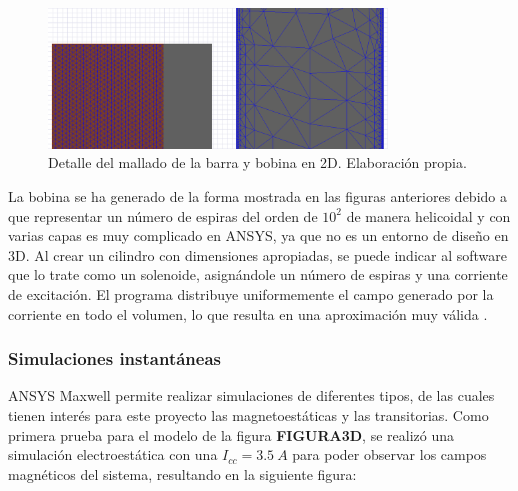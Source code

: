 \begin{itemize}
\begin{figure}[H]
        \label{fig:BarGeomMesh} %
    \end{figure}
    \begin{figure}[H]
        \centering
        \includegraphics[width=9cm]{FigurasMemoria/BarMeshDetail.png}
        \caption{Detalle del mallado de la barra y bobina en 2D. Elaboración propia.}
        \label{fig:GeomMeshDetail} %
    \end{figure}
\end{itemize}

La bobina se ha generado de la forma mostrada en las figuras anteriores debido a que representar un número de espiras del orden de \(10^2\) de manera helicoidal y con varias capas es muy complicado en ANSYS, ya que no es un entorno de diseño en 3D. Al crear un cilindro con dimensiones apropiadas, se puede indicar al software que lo trate como un solenoide, asignándole un número de espiras y una corriente de excitación. El programa distribuye uniformemente el campo generado por la corriente en todo el volumen, lo que resulta en una aproximación muy válida \citep[p. 13]{ansoft2012maxwell}.

\subsubsection{Simulaciones instantáneas}
ANSYS Maxwell permite realizar simulaciones de diferentes tipos, de las cuales tienen interés para este proyecto las magnetoestáticas y las transitorias. Como primera prueba para el modelo de la figura \textbf{FIGURA3D}, se realizó una simulación electroestática con una \(I_{cc}=3.5~A\) para poder observar los campos magnéticos del sistema, resultando en la siguiente figura:

